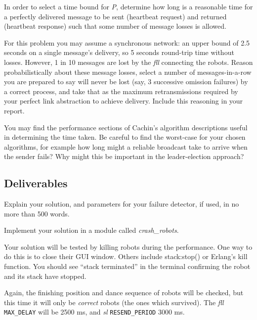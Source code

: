 \documentclass[a4paper]{article}
\begin{document}
In order to select a time bound for \emph{P}, determine how long is a
reasonable time for a perfectly delivered message to be sent (heartbeat
request) and returned (heartbeat response) such that some number of message
losses is allowed.

For this problem you may assume a synchronous network: an upper bound of 2.5
seconds on a single message's delivery, so 5 seconds round-trip time without
losses. However, 1 in 10 messages are lost by the \emph{fll} connecting the
robots. Reason probabilistically about these message losses, select a number
of messages-in-a-row you are prepared to say will never be lost (say, 3
successive omission failures) by a correct process, and take that as the
maximum retransmissions required by your perfect link abstraction to achieve
delivery. Include this reasoning in your report.

You may find the performance sections of Cachin's \cite{cachin2011} algorithm
descriptions useful in determining the time taken. Be careful to find the
worst-case for your chosen algorithms, for example how long might a reliable
broadcast take to arrive when the sender fails? Why might this be important
in the leader-election approach?




\subsection*{Deliverables} %
\label{sub:p2_deliverable}

Explain your solution, and parameters for your failure detector, if used, in
no more than 500 words.

Implement your solution in a module called \emph{crash\_robots}.

Your solution will be tested by killing robots during the performance. One way
to do this is to close their GUI window. Others include stack:stop() or
Erlang's kill function. You should see ``stack terminated'' in the terminal
confirming the robot and its stack have stopped.

Again, the finishing position and dance sequence of robots will be checked,
but this time it will only be \emph{correct} robots (the ones which survived).
The \emph{fll} \verb!MAX_DELAY! will be 2500 ms, and \emph{sl}
\verb!RESEND_PERIOD! 3000 ms.
\end{document}
